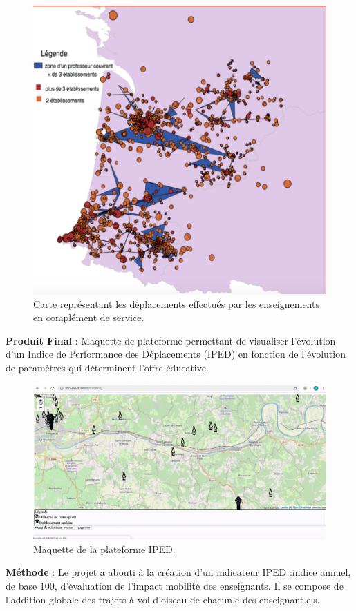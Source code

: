 \documentclass[]{book}
\begin{document}
\begin{figure}

{\centering \includegraphics[width=0.6\linewidth]{./img/iped} 

}

\caption{Carte représentant les déplacements effectués par les enseignements en complément de service.}\label{fig:unnamed-chunk-6}
\end{figure}

\textbf{Produit Final} : Maquette de plateforme permettant de visualiser
l'évolution d'un Indice de Performance des Déplacements (IPED) en
fonction de l'évolution de paramètres qui déterminent l'offre éducative.

\begin{figure}

{\centering \includegraphics[width=0.6\linewidth]{./img/iped2} 

}

\caption{Maquette de la plateforme IPED.}\label{fig:unnamed-chunk-7}
\end{figure}

\textbf{Méthode} : Le projet a abouti à la création d'un indicateur IPED
:indice annuel, de base 100, d'évaluation de l'impact mobilité des
enseignants. Il se compose de l'addition globale des trajets à vol
d'oiseau de chacun.e des enseignant.e.s.
\end{document}

